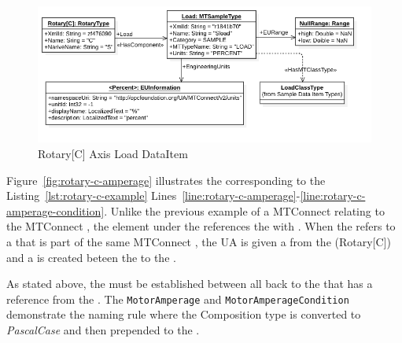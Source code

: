 \begin{figure}[ht]
    \centering
    \includegraphics[width=1.0\textwidth]{diagrams/mtconnect-mapping/rotary-c-load.png}
    \caption{Rotary[C] Axis Load DataItem}
    \label{fig:rotary-c-load}
\end{figure}

\FloatBarrier

Figure~\ref{fig:rotary-c-amperage} illustrates the   corresponding to the Listing~\ref{lst:rotary-c-example} Lines~\ref{line:rotary-c-amperage}-\ref{line:rotary-c-amperage-condition}. Unlike the previous example of a MTConnect  relating to the MTConnect , the  element under the  references the  with  . When the  refers to a  that is part of the same MTConnect , the UA  is given a   from the  (Rotary[C]) and a   is created beteen the  to the .

As stated above, the   must be established between all  back to the  that has a reference from the . The \texttt{MotorAmperage} and \texttt{MotorAmperageCondition} demonstrate the naming rule where the Composition type is converted to \textit{PascalCase} and then prepended to the  . 

